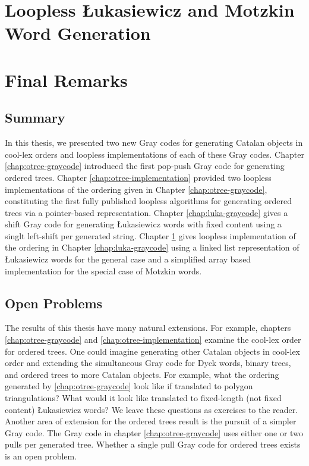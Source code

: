 \chapter{Loopless Łukasiewicz and Motzkin Word Generation} \label{chap:luka-implementation}


\chapter{Final Remarks}

\section{Summary} 
In this thesis, we presented two new Gray codes for generating Catalan objects in cool-lex orders and loopless implementations of each of these Gray codes.  Chapter \ref{chap:otree-graycode} introduced the first pop-push Gray code for generating ordered trees.  Chapter \ref{chap:otree-implementation} provided two loopless implementations of the ordering given in Chapter \ref{chap:otree-graycode}, constituting the first fully published loopless algorithms for generating ordered trees via a pointer-based representation.  Chapter \ref{chap:luka-graycode} gives a shift Gray code for generating Łukasiewicz words with fixed content using a singlt left-shift per generated string. Chapter \ref{chap:luka-implementation} gives loopless implementation of the ordering in Chapter \ref{chap:luka-graycode} using a linked list representation of Łukasiewicz words for the general case and a simplified array based implementation for the special case of Motzkin words.

\section{Open Problems}

The results of this thesis have many natural extensions.  For example, chapters \ref{chap:otree-graycode} and \ref{chap:otree-implementation} examine the cool-lex order for ordered trees. One could imagine generating other Catalan objects in cool-lex order and extending the simultaneous Gray code for Dyck words, binary trees, and ordered trees to more Catalan objects.  For example, what the ordering generated by \ref{chap:otree-graycode} look like if translated to polygon triangulations?  What would it look like translated to fixed-length (not fixed content) Łukasiewicz words? We leave these questions as exercises to the reader.  Another area of extension for the ordered trees result is the pursuit of a simpler Gray code. The Gray code in chapter \ref{chap:otree-graycode} uses either one or two pulls per generated tree.  Whether a single pull Gray code for ordered trees exists is an open problem.  


